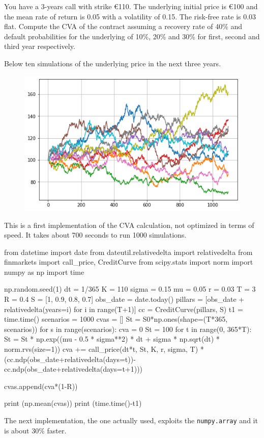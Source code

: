 \begin{question}
You have a 3-years call with strike \euro{110}. The underlying initial price is \euro{100} and the mean rate of return is 0.05 with a volatility of 0.15. The risk-free rate is 0.03 flat.
Compute the CVA of the contract assuming a recovery rate of 40\% and default probabilities for the underlying of 10\%, 20\% and 30\% for first, second and third year respectively.
\end{question}

\begin{solution}
Below ten simulations of the underlying price in the next three years.

\begin{figure}[htbp]
	\centering
\includegraphics[width=0.7\linewidth]{figures/underlying_simulation}
\end{figure}
This is a first implementation of the CVA calculation, not optimized in terms of speed. It takes about 700 seconds to run 1000 simulations.
\end{solution}

\begin{ipython}
from datetime import date
from dateutil.relativedelta import relativedelta
from finmarkets import call_price, CreditCurve
from scipy.stats import norm
import numpy as np
import time

np.random.seed(1)
dt = 1/365
K = 110
sigma = 0.15
mu = 0.05
r = 0.03
T = 3
R = 0.4
S = [1, 0.9, 0.8, 0.7]
obs_date = date.today()
pillars = [obs_date + relativedelta(years=i) for i in range(T+1)]
cc = CreditCurve(pillars, S)
t1 = time.time()
scenarios = 1000
cvas = []
St = S0*np.ones(shape=(T*365, scenarios))
for s in range(scenarios):
    cva = 0
    St = 100
    for t in range(0, 365*T):
        St = St * np.exp((mu - 0.5 * sigma**2) * dt + sigma
            * np.sqrt(dt) * norm.rvs(size=1))
        cva += call_price(dt*t, St, K, r, sigma, T)
            *(cc.ndp(obs_date+relativedelta(days=t))-
            cc.ndp(obs_date+relativedelta(days=t+1)))

        cvas.append(cva*(1-R))

print (np.mean(cvas))
print (time.time()-t1)
\end{ipython}
The next implementation, the one actually used, exploits the \texttt{numpy.array} and it is about 30\% faster.

